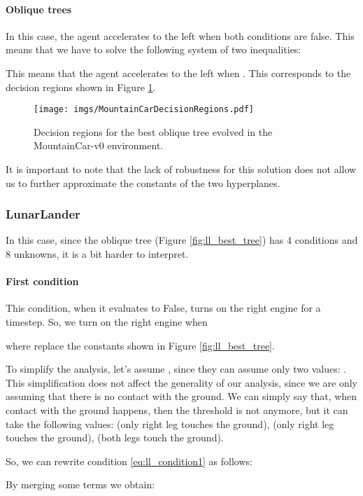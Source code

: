 \documentclass[review,english]{elsarticle}
\begin{document}
\paragraph{Oblique trees}
In this case, the agent accelerates to the left when both conditions are false.
This means that we have to solve the following system of two inequalities:


This means that the agent accelerates to the left when . 
This corresponds to the decision regions shown in Figure \ref{fig:mc_obl_decisionregions}.

\begin{figure}[!ht]
    \centering
    \texttt{[image: imgs/MountainCarDecisionRegions.pdf]}
    \caption{Decision regions for the best oblique tree evolved in the MountainCar-v0 environment.}
    \label{fig:mc_obl_decisionregions}
\end{figure}

It is important to note that the lack of robustness for this solution does not allow us to further approximate the constants of the two hyperplanes.

\subsubsection{LunarLander}
In this case, since the oblique tree (Figure \ref{fig:ll_best_tree}) has 4 conditions and 8 unknowns, it is a bit harder to interpret.
\paragraph{First condition}
This condition, when it evaluates to False, turns on the right engine for a timestep.
So, we turn on the right engine when

where  replace the constants shown in Figure \ref{fig:ll_best_tree}.

To simplify the analysis, let's assume , since they can assume only two values: .
This simplification does not affect the generality of our analysis, since we are only assuming that there is no contact with the ground.
We can simply say that, when contact with the ground happens, then the threshold is not  anymore, but it can take the following values:  (only right leg touches the ground),  (only right leg touches the ground),  (both legs touch the ground).

So, we can rewrite condition \ref{eq:ll_condition1} as follows:

By merging some terms we obtain:
\end{document}
